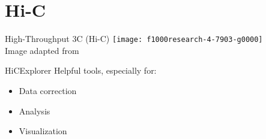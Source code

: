 \section{Hi-C}

\begin{frame}[c]{High-Throughput 3C (Hi-C)}
    \normalsize
    \texttt{[image: f1000research-4-7903-g0000]} \\
    Image adapted from \cite{wingett2015hicup}

\end{frame}





\begin{frame}[c]{HiCExplorer}
    Helpful tools, especially for:
    \begin{itemize}[<+(1)->]
        \item Data correction
        \item Analysis
        \item Visualization
    \end{itemize}
\end{frame}




